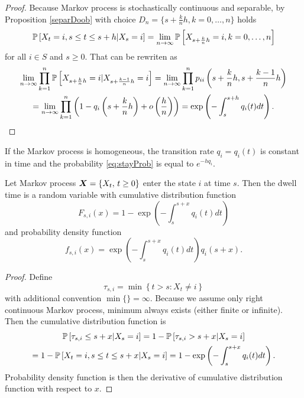 {\begin{proof}
	Because Markov process is stochastically continuous and separable, by Proposition \ref{separDoob} with choice $D_n = \{s + \frac{k}{n} h, k = 0, \ldots, n \}$ holds
	\begin{equation}
		\label{eq:stayProb}
		\operatorname{\mathbb{P}} \left[ X_t = i, s \leq t \leq s+h \vert X_s = i \right] = \lim_{n \to \infty} \operatorname{\mathbb{P}} \left[ X_{s + \frac{k}{n} h} = i, k = 0, \ldots, n \right]
	\end{equation}
	for all $i \in S$ and $s \geq 0$. That can be rewriten as
	\begin{multline*}
		\lim_{n \to \infty} \prod_{k=1}^{n} \operatorname{\mathbb{P}} \left[ X_{s + \frac{k}{n} h} = i \vert X_{s + \frac{k-1}{n} h} = i \right]
		= \lim_{n \to \infty} \prod_{k=1}^{n} p_{ii} \left(s + \frac{k}{n} h, s + \frac{k-1}{n} h \right) \\
		= \lim_{n \to \infty} \prod_{k=1}^{n} \left( 1 - q_i \left(s + \frac{k}{n} h \right) + o \left( \frac{h}{n} \right) \right)
		= \exp \left(- \int_{s}^{s+h} q_i(t) dt \right).
	\end{multline*}
\end{proof}

If the Markov process is homogeneous, the transition rate $q_i = q_i (t)$ is constant in time and the probability \ref{eq:stayProb} is equal to $e^{- h q_i}$.

\begin{proposition} %
	\label{prop:dwellTime}
	Let Markov process $\bm{X} = \{ X_t ,\, t \geq 0 \}$ enter the state $i$ at time $s$. Then the dwell time is a random variable with cumulative distribution function
	\[
		F_{s,i} (x) = 1 - \exp \left(- \int_{s}^{s+x} q_i(t) dt \right)
	\]
	and probability density function
	\[
		f_{s,i} (x) = \exp \left(- \int_{s}^{s+x} q_i(t) dt \right) q_i(s+x).
	\]
\end{proposition}

\begin{proof}
	Define
	\begin{equation}
		\label{eq:tausi}
		\tau_{s,i} = \min \left\{t>s: X_t \neq i \right\}
	\end{equation}
	with additional convention $\min \{ \} = \infty$. Because we assume only right continuous Markov process, minimum always exists (either finite or infinite). Then the cumulative distribution function is
	\begin{multline*}
		\operatorname{\mathbb{P}} \left[ \tau_{s,i} \leq s+x \vert X_s = i \right]
		= 1 - \operatorname{\mathbb{P}} \left[ \tau_{s,i} > s+x \vert X_s = i \right] \\
		= 1 - \operatorname{\mathbb{P}} \left[ X_t = i, s \leq t \leq s+x \vert X_s = i \right]
		= 1 - \exp \left(- \int_{s}^{s+x} q_i(t) dt \right).
	\end{multline*}
	Probability density function is then the derivative of cumulative distribution function with respect to $x$.
\end{proof}

}

